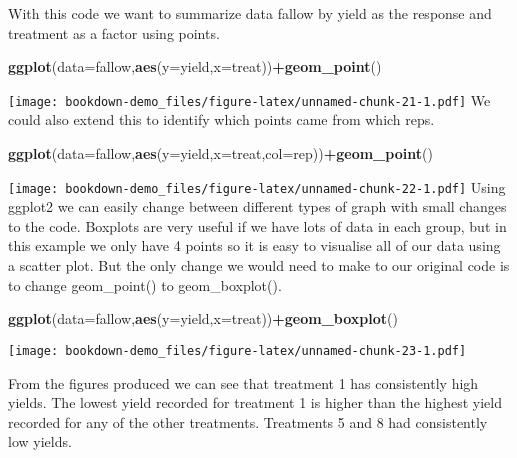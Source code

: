 \documentclass[]{book}
\newenvironment{Shaded}{\begin{snugshade}}{\end{snugshade}}
\newcommand{\KeywordTok}[1]{\textcolor[rgb]{0.13,0.29,0.53}{\textbf{#1}}}
\newcommand{\DataTypeTok}[1]{\textcolor[rgb]{0.13,0.29,0.53}{#1}}
\newcommand{\OperatorTok}[1]{\textcolor[rgb]{0.81,0.36,0.00}{\textbf{#1}}}
\newcommand{\NormalTok}[1]{#1}
\theoremstyle{definition}
\theoremstyle{definition}
\theoremstyle{definition}
\theoremstyle{remark}
\begin{document}
With this code we want to summarize data fallow by yield as the response
and treatment as a factor using points.

\begin{Shaded}
\begin{Highlighting}[]
\KeywordTok{ggplot}\NormalTok{(}\DataTypeTok{data=}\NormalTok{fallow,}\KeywordTok{aes}\NormalTok{(}\DataTypeTok{y=}\NormalTok{yield,}\DataTypeTok{x=}\NormalTok{treat))}\OperatorTok{+}\KeywordTok{geom_point}\NormalTok{()}
\end{Highlighting}
\end{Shaded}

\texttt{[image: bookdown-demo\_files/figure-latex/unnamed-chunk-21-1.pdf]}
We could also extend this to identify which points came from which reps.

\begin{Shaded}
\begin{Highlighting}[]
\KeywordTok{ggplot}\NormalTok{(}\DataTypeTok{data=}\NormalTok{fallow,}\KeywordTok{aes}\NormalTok{(}\DataTypeTok{y=}\NormalTok{yield,}\DataTypeTok{x=}\NormalTok{treat,}\DataTypeTok{col=}\NormalTok{rep))}\OperatorTok{+}\KeywordTok{geom_point}\NormalTok{()}
\end{Highlighting}
\end{Shaded}

\texttt{[image: bookdown-demo\_files/figure-latex/unnamed-chunk-22-1.pdf]}
Using ggplot2 we can easily change between different types of graph with
small changes to the code. Boxplots are very useful if we have lots of
data in each group, but in this example we only have 4 points so it is
easy to visualise all of our data using a scatter plot. But the only
change we would need to make to our original code is to change
geom\_point() to geom\_boxplot().

\begin{Shaded}
\begin{Highlighting}[]
\KeywordTok{ggplot}\NormalTok{(}\DataTypeTok{data=}\NormalTok{fallow,}\KeywordTok{aes}\NormalTok{(}\DataTypeTok{y=}\NormalTok{yield,}\DataTypeTok{x=}\NormalTok{treat))}\OperatorTok{+}\KeywordTok{geom_boxplot}\NormalTok{()}
\end{Highlighting}
\end{Shaded}

\texttt{[image: bookdown-demo\_files/figure-latex/unnamed-chunk-23-1.pdf]}

From the figures produced we can see that treatment 1 has consistently
high yields. The lowest yield recorded for treatment 1 is higher than
the highest yield recorded for any of the other treatments. Treatments 5
and 8 had consistently low yields.
\end{document}
